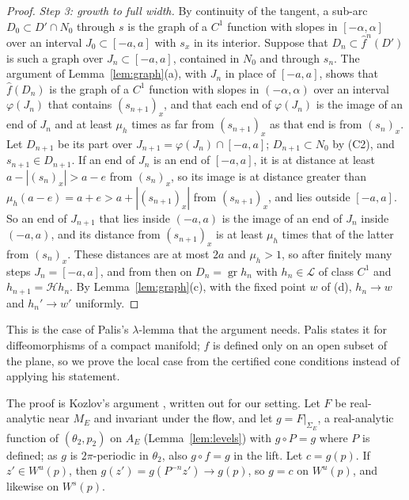 \documentclass[11pt]{article}
\theoremstyle{definition}
\begin{document}
\begin{proof}
\emph{Step 3: growth to full width.} By continuity of the tangent, a sub-arc $D_0 \subset D' \cap N_0$ through $s$ is the graph of a $C^1$ function with slopes in $[-\alpha, \alpha]$ over an interval $J_0 \subset [-a, a]$ with $s_x$ in its interior. Suppose that $D_n \subset \hat f^n(D')$ is such a graph over $J_n \subset [-a, a]$, contained in $N_0$ and through $s_n$. The argument of Lemma~\ref{lem:graph}(a), with $J_n$ in place of $[-a, a]$, shows that $\hat f(D_n)$ is the graph of a $C^1$ function with slopes in $(-\alpha, \alpha)$ over an interval $\varphi(J_n)$ that contains $(s_{n+1})_x$, and that each end of $\varphi(J_n)$ is the image of an end of $J_n$ and at least $\mu_h$ times as far from $(s_{n+1})_x$ as that end is from $(s_n)_x$. Let $D_{n+1}$ be its part over $J_{n+1} = \varphi(J_n) \cap [-a, a]$; $D_{n+1} \subset N_0$ by (C2), and $s_{n+1} \in D_{n+1}$. If an end of $J_n$ is an end of $[-a, a]$, it is at distance at least $a - |(s_n)_x| > a - e$ from $(s_n)_x$, so its image is at distance greater than $\mu_h(a - e) = a + e > a + |(s_{n+1})_x|$ from $(s_{n+1})_x$, and lies outside $[-a, a]$. So an end of $J_{n+1}$ that lies inside $(-a, a)$ is the image of an end of $J_n$ inside $(-a, a)$, and its distance from $(s_{n+1})_x$ is at least $\mu_h$ times that of the latter from $(s_n)_x$. These distances are at most $2a$ and $\mu_h > 1$, so after finitely many steps $J_n = [-a, a]$, and from then on $D_n = \operatorname{gr}h_n$ with $h_n \in \mathcal L$ of class $C^1$ and $h_{n+1} = \mathcal H h_n$. By Lemma~\ref{lem:graph}(c), with the fixed point $w$ of (d), $h_n \to w$ and $h_n' \to w'$ uniformly.
\end{proof}

This is the case of Palis's $\lambda$-lemma \cite[Lemma~1.1, p.~387]{palis1969} that the argument needs. Palis states it for diffeomorphisms of a compact manifold; $f$ is defined only on an open subset of the plane, so we prove the local case from the certified cone conditions instead of applying his statement.

The proof is Kozlov's argument \cite[Ch.~V, \S2, proof of Thm.~3]{kozlov1983}, written out for our setting. Let $F$ be real-analytic near $M_E$ and invariant under the flow, and let $g = F|_{\Sigma_E}$, a real-analytic function of $(\theta_2, p_2)$ on $A_E$ (Lemma~\ref{lem:levels}) with $g \circ P = g$ where $P$ is defined; as $g$ is $2\pi$-periodic in $\theta_2$, also $g \circ f = g$ in the lift. Let $c = g(p)$. If $z' \in W^u(p)$, then $g(z') = g(P^{-n}z') \to g(p)$, so $g = c$ on $W^u(p)$, and likewise on $W^s(p)$.
\end{document}
